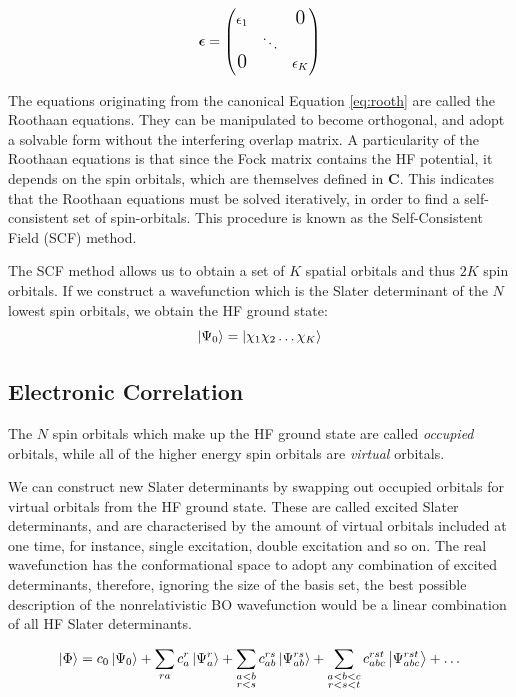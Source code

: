 \begin{gather}
    \bm{\epsilon} =
  \begin{pmatrix}
    \epsilon_{1} & & \mbox{\Large 0}\\
    & \ddots & \\
    \mbox{\Large 0} & & \epsilon_K
  \end{pmatrix}
\end{gather}

 The equations originating from the canonical Equation \ref{eq:rooth} are called the Roothaan equations. They can be manipulated to become orthogonal, and adopt a solvable form without the interfering overlap matrix. A particularity of the Roothaan equations is that since the Fock matrix contains the HF potential, it depends on the spin orbitals, which are themselves defined in $\bm{C}$. This indicates that the Roothaan equations must be solved iteratively, in order to find a self-consistent set of spin-orbitals. This procedure is known as the Self-Consistent Field (SCF) method.

The SCF method allows us to obtain a set of $K$ spatial orbitals and thus $2K$ spin orbitals. If we construct a wavefunction which is the Slater determinant of the $N$ lowest spin orbitals, we obtain the HF ground state:
\begin{equation}
    \ket{\Psi_0} = \ket{\chi_1 \chi_2 \ldots \chi_K}
\end{equation}

\subsection{Electronic Correlation}

The $N$ spin orbitals which make up the HF ground state are called \textit{occupied} orbitals, while all of the higher energy spin orbitals are \textit{virtual} orbitals.

We can construct new Slater determinants by swapping out occupied orbitals for virtual orbitals from the HF ground state. These are called excited Slater determinants, and are characterised by the amount of virtual orbitals included at one time, for instance, single excitation, double excitation and so on. The real wavefunction has the conformational space to adopt any combination of excited determinants, therefore, ignoring the size of the basis set, the best possible description of the nonrelativistic BO wavefunction would be a linear combination of all HF Slater determinants.

\begin{equation}
    \ket{\Phi} = c_0 \ket{\Psi_0} + \sum_{ra} c^r_a\ket{\Psi^r_a} + \sum_{\substack{a<b\\r<s}} c^{rs}_{ab}\ket{\Psi^{rs}_{ab}} + \sum_{\substack{a<b<c\\r<s<t}} c^{rst}_{abc}\ket{\Psi^{rst}_{abc}} + \ldots
    \label{eq:fullci}
\end{equation}

